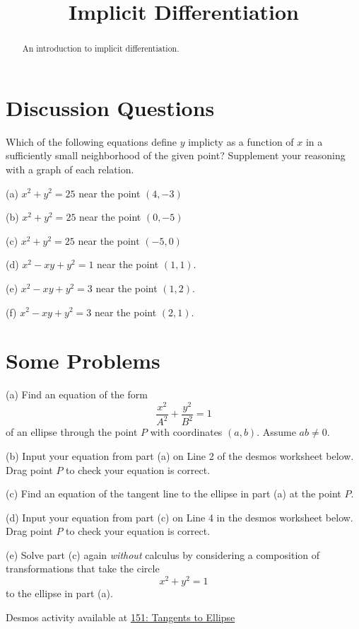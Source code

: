 \documentclass{ximera}
\title{Implicit Differentiation}
\begin{document}
\begin{abstract}
An introduction to implicit differentiation.
\end{abstract}
\maketitle

\section*{Discussion Questions}

\begin{question}  \label{Q:dsftr4tr656t}
Which of the following equations define $y$ implicty as a function of $x$ in a sufficiently small neighborhood of the given point? Supplement your reasoning with a graph of each relation.

(a) $x^2 + y^2 = 25$ near the point $(4,-3)$

(b) $x^2 + y^2 = 25$ near the point $(0,-5)$

(c) $x^2 + y^2 = 25$ near the point $(-5,0)$

(d) $x^2 - xy + y^2 = 1$ near the point $(1,1)$.

(e) $x^2 - xy + y^2 = 3$ near the point $(1,2)$.

(f) $x^2 - xy + y^2 = 3$ near the point $(2,1)$.

\end{question}

\section*{Some Problems}

\begin{question}  \label{Q:4bbfdellk}
(a) Find an equation of the form 
\[
   \frac{x^2}{A^2} + \frac{y^2}{B^2} = 1
\]
of an ellipse through the point $P$ with coordinates $(a,b)$. Assume $ab\neq 0$.

(b) Input your equation from part (a) on Line 2 of the desmos worksheet below. Drag point $P$ to check your equation is correct.

(c) Find an equation of the tangent line to the ellipse in part (a) at the point $P$.

(d) Input your equation from part (c) on Line 4 in the desmos worksheet below. Drag point $P$ to check your equation is correct.

(e) Solve part (c) again \emph{without} calculus by considering a composition of transformations that take the circle
\[
       x^2 + y^2 = 1
\]
to the ellipse in part (a).

\begin{onlineOnly}
    \begin{center}
\end{center}
\end{onlineOnly}

Desmos activity available at \href{https://www.desmos.com/calculator/jl0nyqwukz}{151: Tangents to Ellipse}

\end{question}
\end{document}
